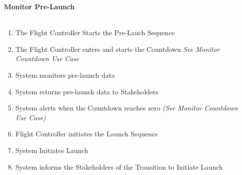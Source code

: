 \documentclass[letterpaper]{article}
\begin{document}
\noindent
\textbf{Monitor Pre-Launch}\\\\
\begin{enumerate}
\item The Flight Controller Starts the Pre-Lauch Sequence
\item The Flight Controller enters and starts the Countdown \textit{
See Monitor Countdown Use Case}
\item System monitors pre-launch data
\item System returns pre-launch data to Stakeholders
\item System alerts when the Countdown reaches zero \textit{(See
Monitor Countdown Use Case)}
\item Flight Controller initiates the Launch Sequence
\item System Initiates Launch
\item System informs the Stakeholders of the Transition to Initiate
Launch
\end{enumerate}
\end{document}
